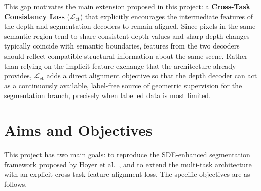 This gap motivates the main extension proposed in this project: a
\textbf{Cross-Task Consistency Loss} ($\mathcal{L}_\text{ct}$) that
explicitly encourages the intermediate features of the depth and
segmentation decoders to remain aligned. Since pixels in the same semantic
region tend to share consistent depth values and sharp depth changes
typically coincide with semantic boundaries, features from the two decoders
should reflect compatible structural information about the same scene.
Rather than relying on the implicit feature exchange that the architecture
already provides, $\mathcal{L}_\text{ct}$ adds a direct alignment objective
so that the depth decoder can act as a continuously available, label-free
source of geometric supervision for the segmentation branch, precisely when
labelled data is most limited.

\section{Aims and Objectives}

This project has two main goals: to reproduce the SDE-enhanced segmentation
framework proposed by Hoyer et al.~\cite{hoyer2023improving}, and to extend
the multi-task architecture with an explicit cross-task feature alignment
loss. The specific objectives are as follows.

